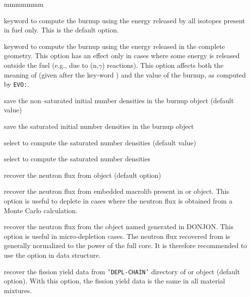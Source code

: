 \begin{ListeDeDescription}{mmmmmmm}
\item[\moc{NOGL}] keyword to compute the burnup using the energy released by all isotopes present in
fuel only. This is the default option.

\item[\moc{GLOB}]  keyword to compute the burnup using the energy released in
the complete geometry. This option has an effect only in cases where some
energy is released outside the fuel (e.g., due to (n,$\gamma$) reactions).
This option affects both the meaning of  (given after the
key-word ) and the value of the burnup, as computed by {\tt EVO:}.

\item[\moc{NSAT}] save the non--saturated initial number densities in the {\sc burnup}
object  (default value)

\item[\moc{SAT}]  save the saturated initial number densities in the {\sc burnup}
object 

\item[\moc{NODI}]  select  to compute the saturated number densities
(default value)

\item[\moc{DIRA}]  select  to compute the saturated number densities

\item[\moc{FLUX\_FLUX}]  recover the neutron flux from  object (default option)

\item[\moc{FLUX\_MAC}]  recover the neutron flux from embedded macrolib present in  or 
object. This option is useful to deplete in cases where the neutron flux is obtained from a Monte Carlo
calculation.

\item[\moc{FLUX\_POW}]  recover the neutron flux from the  object named  generated in DONJON. This option is useful in
micro-depletion cases. The neutron flux recovered from  is generally normalized to the power of the full core. It is therefore
recommended to use the  option in  data structure.

\item[\moc{CHAIN}]  recover the fission yield data from {\tt 'DEPL-CHAIN'} directory of  or 
object (default option). With this option, the fission yield data is the same in all material mixtures.


\end{ListeDeDescription}
